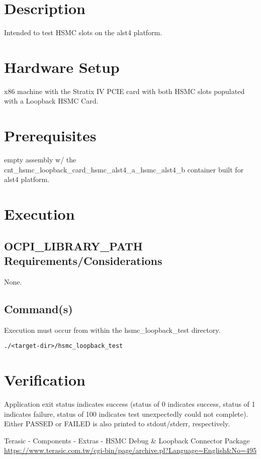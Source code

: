 \section{Description}
Intended to test HSMC slots on the alst4 platform.
\section{Hardware Setup}
x86 machine with the Stratix IV PCIE card with both HSMC slots populated with a Loopback HSMC Card\cite{debugcard}.
\section{Prerequisites}
empty assembly w/ the cnt\_hsmc\_loopback\_card\_hsmc\_alst4\_a\_hsmc\_alst4\_b container built for alst4 platform.
\section{Execution}
\subsection{OCPI\_LIBRARY\_PATH Requirements/Considerations}
None.
\subsection{Command(s)}
Execution must occur from within the hsmc\_loopback\_test directory. \\
\begin{lstlisting}
./<target-dir>/hsmc_loopback_test
\end{lstlisting}
\section{Verification}
Application exit status indicates success (status of 0 indicates success, status of 1 indicates failure, status of 100 indicates test unexpectedly could not complete). Either PASSED or FAILED is also printed to stdout/stderr, respectively.

\begin{thebibliography}{1}

 Terasic - Components - Extras - HSMC Debug \& Loopback Connector Package
\url{https://www.terasic.com.tw/cgi-bin/page/archive.pl?Language=English&No=495}

\end{thebibliography}


